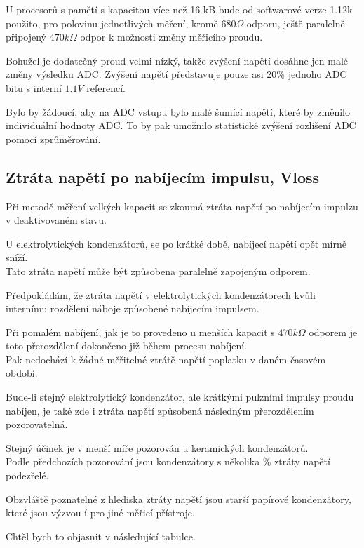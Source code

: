 U procesorů s pamětí s kapacitou více než 16 kB bude od softwarové verze 1.12k použito, pro polovinu jednotlivých měření, kromě \(680\Omega\) odporu, ještě paralelně připojený \(470k\Omega\) odpor
k možnosti změny měřicího proudu.

Bohužel je dodatečný proud velmi nízký, takže zvýšení napětí dosáhne jen malé změny výsledku ADC.
Zvýšení napětí představuje pouze asi 20\% jednoho ADC bitu s interní \(1.1V\) referencí.

Bylo by žádoucí, aby na ADC vstupu bylo malé šumící napětí, které by změnilo individuální hodnoty ADC.
To by pak umožnilo statistické zvýšení rozlišení ADC pomocí zprůměrování. 


\subsection{Ztráta napětí po nabíjecím impulsu, Vloss}
Při metodě měření velkých kapacit se zkoumá ztráta napětí po nabíjecím impulzu v deaktivovaném stavu.

U elektrolytických kondenzátorů, se po krátké době, nabíjecí napětí opět mírně sníží.\\
Tato ztráta napětí může být způsobena paralelně zapojeným odporem.

Předpokládám, že ztráta napětí v elektrolytických kondenzátorech kvůli internímu rozdělení náboje způsobené nabíjecím impulsem.

Při pomalém nabíjení, jak je to provedeno  u menších kapacit s \(470k\Omega\)  odporem
je toto přerozdělení dokončeno již během procesu nabíjení.\\ Pak nedochází k žádné měřitelné ztrátě napětí
poplatku v daném časovém období.

Bude-li stejný elektrolytický kondenzátor, ale krátkými pulzními impulsy proudu nabíjen, je také zde i ztráta napětí způsobená následným přerozdělením pozorovatelná.

Stejný účinek je v menší míře pozorován u keramických kondenzátorů.\\
Podle předchozích pozorování jsou kondenzátory s několika  \% ztráty napětí podezřelé.

Obzvláště poznatelné z hlediska ztráty napětí jsou starší papírové kondenzátory, které jsou výzvou í pro jiné měřicí přístroje. 

Chtěl bych to objasnit v následující tabulce.

\vspace{0.5 cm}

